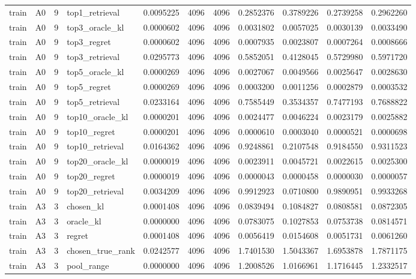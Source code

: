 \begin{tabular}{llrlrrrrrrr}
train & A0 & 9 & top1_retrieval & 0.0095225 & 4096 & 4096 & 0.2852376 & 0.3789226 & 0.2739258 & 0.2962260 \\
train & A0 & 9 & top3_oracle_kl & 0.0000602 & 4096 & 4096 & 0.0031802 & 0.0057025 & 0.0030139 & 0.0033490 \\
train & A0 & 9 & top3_regret & 0.0000602 & 4096 & 4096 & 0.0007935 & 0.0023807 & 0.0007264 & 0.0008666 \\
train & A0 & 9 & top3_retrieval & 0.0295773 & 4096 & 4096 & 0.5852051 & 0.4128045 & 0.5729980 & 0.5971720 \\
train & A0 & 9 & top5_oracle_kl & 0.0000269 & 4096 & 4096 & 0.0027067 & 0.0049566 & 0.0025647 & 0.0028630 \\
train & A0 & 9 & top5_regret & 0.0000269 & 4096 & 4096 & 0.0003200 & 0.0011256 & 0.0002879 & 0.0003532 \\
train & A0 & 9 & top5_retrieval & 0.0233164 & 4096 & 4096 & 0.7585449 & 0.3534357 & 0.7477193 & 0.7688822 \\
train & A0 & 9 & top10_oracle_kl & 0.0000201 & 4096 & 4096 & 0.0024477 & 0.0046224 & 0.0023179 & 0.0025882 \\
train & A0 & 9 & top10_regret & 0.0000201 & 4096 & 4096 & 0.0000610 & 0.0003040 & 0.0000521 & 0.0000698 \\
train & A0 & 9 & top10_retrieval & 0.0164362 & 4096 & 4096 & 0.9248861 & 0.2107548 & 0.9184550 & 0.9311523 \\
train & A0 & 9 & top20_oracle_kl & 0.0000019 & 4096 & 4096 & 0.0023911 & 0.0045721 & 0.0022615 & 0.0025300 \\
train & A0 & 9 & top20_regret & 0.0000019 & 4096 & 4096 & 0.0000043 & 0.0000458 & 0.0000030 & 0.0000057 \\
train & A0 & 9 & top20_retrieval & 0.0034209 & 4096 & 4096 & 0.9912923 & 0.0710800 & 0.9890951 & 0.9933268 \\
train & A3 & 3 & chosen_kl & 0.0001408 & 4096 & 4096 & 0.0839494 & 0.1084827 & 0.0808581 & 0.0872305 \\
train & A3 & 3 & oracle_kl & 0.0000000 & 4096 & 4096 & 0.0783075 & 0.1027853 & 0.0753738 & 0.0814571 \\
train & A3 & 3 & regret & 0.0001408 & 4096 & 4096 & 0.0056419 & 0.0154608 & 0.0051731 & 0.0061260 \\
train & A3 & 3 & chosen_true_rank & 0.0242577 & 4096 & 4096 & 1.7401530 & 1.5043367 & 1.6953878 & 1.7871175 \\
train & A3 & 3 & pool_range & 0.0000000 & 4096 & 4096 & 1.2008526 & 1.0166961 & 1.1716445 & 1.2332517 \\

\end{tabular}
